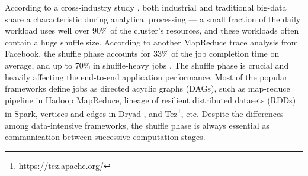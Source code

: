 {\color{black}
According to a cross-industry study \cite{chen2012interactive}, both industrial and traditional big-data share a characteristic during analytical processing --- a small fraction of the daily workload uses well over 90\% of the cluster’s resources, and these workloads often contain a huge shuffle size. 
According to another MapReduce trace analysis from Facebook, the shuffle phase accounts for $33\%$ of the job completion time on average, and up to $70\%$ in shuffle-heavy jobs \cite{managing}.
The shuffle phase is crucial and heavily affecting the end-to-end application performance.
Most of the popular frameworks define jobs as directed acyclic graphs (DAGs), such as map-reduce pipeline in Hadoop MapReduce, lineage of resilient distributed datasets (RDDs) in Spark, vertices and edges in Dryad \cite{dryad}, and Tez\footnote{https://tez.apache.org/}, etc.
Despite the differences among data-intensive frameworks, the shuffle phase is always essential as communication between successive computation stages.
}

